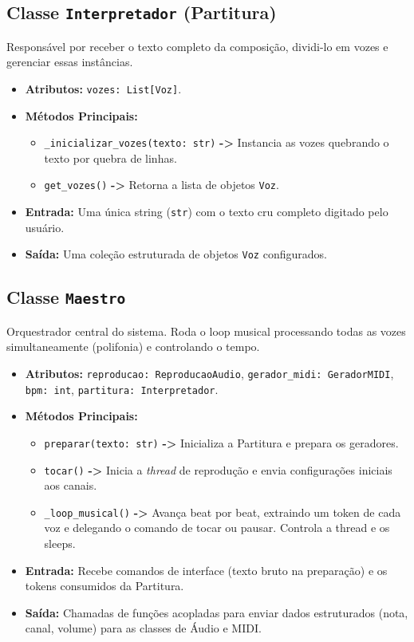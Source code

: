 \documentclass[12pt, a4paper]{article}
\begin{document}
\subsection{Classe \texttt{Interpretador} (Partitura)}
Responsável por receber o texto completo da composição, dividi-lo em vozes e gerenciar essas instâncias.
\begin{itemize}[leftmargin=2cm]
  \item \textbf{Atributos:} \texttt{vozes: List[Voz]}.
  \item \textbf{Métodos Principais:}
    \begin{itemize}
      \item \texttt{\_inicializar\_vozes(texto: str)} \textbf{->} Instancia as vozes quebrando o texto por quebra de linhas.
      \item \texttt{get\_vozes()} \textbf{->} Retorna a lista de objetos \texttt{Voz}.
    \end{itemize}
  \item \textbf{Entrada:} Uma única string (\texttt{str}) com o texto cru completo digitado pelo usuário.
  \item \textbf{Saída:} Uma coleção estruturada de objetos \texttt{Voz} configurados.
\end{itemize}

\subsection{Classe \texttt{Maestro}}
Orquestrador central do sistema. Roda o loop musical processando todas as vozes simultaneamente (polifonia) e controlando o tempo.
\begin{itemize}[leftmargin=2cm]
  \item \textbf{Atributos:} \texttt{reproducao: ReproducaoAudio}, \texttt{gerador\_midi: GeradorMIDI}, \texttt{bpm: int}, \texttt{partitura: Interpretador}.
  \item \textbf{Métodos Principais:}
    \begin{itemize}
      \item \texttt{preparar(texto: str)} \textbf{->} Inicializa a Partitura e prepara os geradores.
      \item \texttt{tocar()} \textbf{->} Inicia a \textit{thread} de reprodução e envia configurações iniciais aos canais.
      \item \texttt{\_loop\_musical()} \textbf{->} Avança beat por beat, extraindo um token de cada voz e delegando o comando de tocar ou pausar. Controla a thread e os sleeps.
    \end{itemize}
  \item \textbf{Entrada:} Recebe comandos de interface (texto bruto na preparação) e os tokens consumidos da Partitura.
  \item \textbf{Saída:} Chamadas de funções acopladas para enviar dados estruturados (nota, canal, volume) para as classes de Áudio e MIDI.
\end{itemize}
\end{document}
